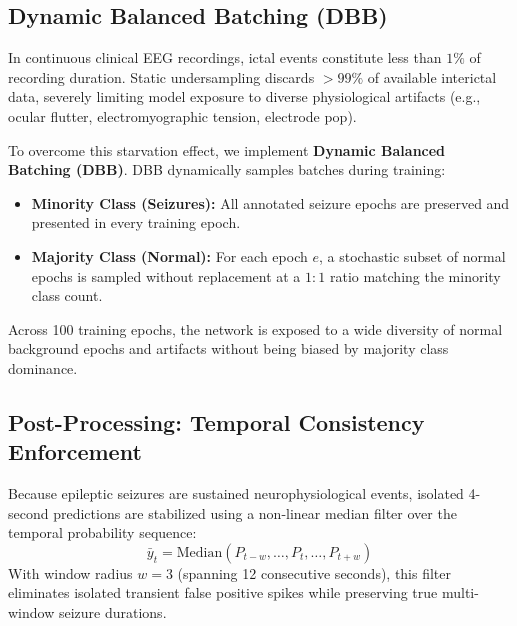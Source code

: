 \documentclass[journal]{IEEEtran}
\begin{document}
\subsection{Dynamic Balanced Batching (DBB)}
In continuous clinical EEG recordings, ictal events constitute less than $1\%$ of recording duration. Static undersampling discards $>99\%$ of available interictal data, severely limiting model exposure to diverse physiological artifacts (e.g., ocular flutter, electromyographic tension, electrode pop). 

To overcome this starvation effect, we implement \textbf{Dynamic Balanced Batching (DBB)}. DBB dynamically samples batches during training:
\begin{itemize}
    \item \textbf{Minority Class (Seizures):} All annotated seizure epochs are preserved and presented in every training epoch.
    \item \textbf{Majority Class (Normal):} For each epoch $e$, a stochastic subset of normal epochs is sampled without replacement at a $1:1$ ratio matching the minority class count.
\end{itemize}
Across 100 training epochs, the network is exposed to a wide diversity of normal background epochs and artifacts without being biased by majority class dominance.

\subsection{Post-Processing: Temporal Consistency Enforcement}
Because epileptic seizures are sustained neurophysiological events, isolated 4-second predictions are stabilized using a non-linear median filter over the temporal probability sequence:
\begin{equation}
\bar{y}_t = \text{Median}(P_{t-w}, \dots, P_t, \dots, P_{t+w})
\end{equation}
With window radius $w=3$ (spanning 12 consecutive seconds), this filter eliminates isolated transient false positive spikes while preserving true multi-window seizure durations.
\end{document}
